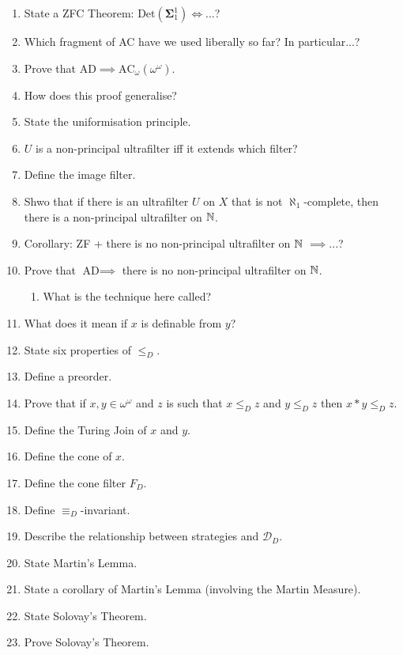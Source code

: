 \documentclass[]{article}
\newcommand{\om}{\omega}
\renewcommand{\ac}{\textrm{AC}}
\newcommand{\bosig}{\bm{\Sigma}}
\newcommand{\Det}{\textrm{Det}}
\newcommand{\ad}{\textrm{AD}}
\begin{document}
\begin{enumerate}
    \item State a ZFC Theorem: $\Det(\bosig^1_1) \iff $...?
    \item Which fragment of AC have we used liberally so far? In particular...?
    \item Prove that $\ad\implies\ac_{\om}(\om^\om)$.
    \item How does this proof generalise?
    \item State the uniformisation principle.
    \item $U$ is a non-principal ultrafilter iff it extends which filter?
    \item Define the image filter.
    \item Shwo that if there is an ultrafilter $U$ on $X$ that is not $\aleph_1$-complete, then there is a non-principal ultrafilter on $\mathbb{N}$.
    \item Corollary: ZF + there is no non-principal ultrafilter on $\mathbb{N}$ $\implies$...?
    \item Prove that $\ad\implies$ there is no non-principal ultrafilter on $\mathbb{N}$.
    \begin{enumerate}
        \item What is the technique here called?
    \end{enumerate}
    \item What does it mean if $x$ is definable from $y$?
    \item State six properties of $\le_D$.
    \item Define a preorder.
    \item Prove that if $x,y\in\om^\om$ and $z$ is such that $x\le_Dz$ and $y\le_D z$ then $x\ast y \le_Dz$.
    \item Define the Turing Join of $x$ and $y$.
    \item Define the cone of $x$.
    \item Define the cone filter $F_D$.
    \item Define $\equiv_D$-invariant.
    \item Describe the relationship between strategies and $\mathcal{D}_D$.
    \item State Martin's Lemma.
    \item State a corollary of Martin's Lemma (involving the Martin Measure).
    \item State Solovay's Theorem.
    \item Prove Solovay's Theorem.
\end{enumerate}
\end{document}
